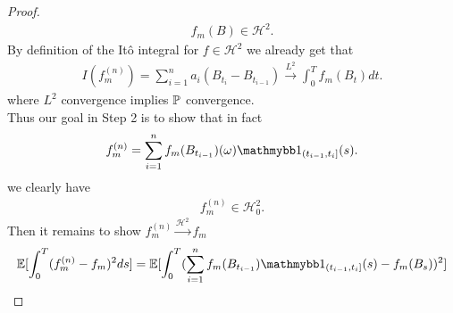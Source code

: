 \begin{proof}
\begin{align*}
  f_m(B) \in  \mathcal{H}^2
.\end{align*}
By definition of the It\^o integral for $f \in \mathcal{H}^2$ we already get that  
\begin{align*}
  I(f_m^{(n)} ) = \sum_{i=1}^{n} a_i (B_{t_{i}}  - B_{t_{i-1}}) \xrightarrow{L^2} \int_0^{T}  f_m(B_t) dt 
.\end{align*}
where $L^2$ convergence implies $\P$ convergence. \\[1ex]
Thus our goal in Step 2 is to show that  in fact
\begin{align*}
  f_m^{(n)}   = \sum_{i=1}^{n}  f_m(B_{t_{i-1}})(\omega )\cha_{(t_{i-1},t_i]}(s) 
.\end{align*}
we clearly have
\begin{align*}
  f_m^{(n)}   \in  \mathcal{H}_{0}^2
.\end{align*}
Then it  remains to show $f_m^{(n)} \xrightarrow{\mathcal{H}^{2} } f_m $ 
\begin{align*}
  \E[\int_0^{T}  (f_m^{(n)} - f_m )^2 ds] &= \E[\int_0^{T} (\sum_{i=1}^{n} f_m(B_{t_{i-1}})\cha_{(t_{i-1},t_i]}(s) - f_m(B_s))^2 ] \\

\end{align*}
\end{proof}
